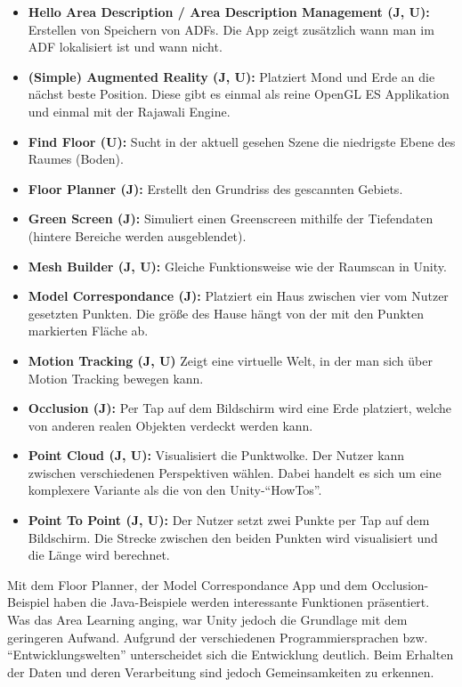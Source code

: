 \begin{itemize}
	\item\textbf{Hello Area Description / Area Description Management (J, U):} Erstellen von Speichern von ADFs. Die App zeigt zusätzlich wann man im ADF lokalisiert ist und wann nicht.
	\item\textbf{(Simple) Augmented Reality (J, U):} Platziert Mond und Erde an die nächst beste Position. Diese gibt es einmal als reine OpenGL ES Applikation und einmal mit der Rajawali Engine.
	\item\textbf{Find Floor (U):} Sucht in der aktuell gesehen Szene die niedrigste Ebene des Raumes (Boden).
	\item\textbf{Floor Planner (J):} Erstellt den Grundriss des gescannten Gebiets.
	\item\textbf{Green Screen (J):} Simuliert einen Greenscreen mithilfe der Tiefendaten (hintere Bereiche werden ausgeblendet).
	\item\textbf{Mesh Builder (J, U):} Gleiche Funktionsweise wie der Raumscan in Unity.
	\item\textbf{Model Correspondance (J):} Platziert ein Haus zwischen vier vom Nutzer gesetzten Punkten. Die größe des Hause hängt von der mit den Punkten markierten Fläche ab.
	\item\textbf{Motion Tracking (J, U)} Zeigt eine virtuelle Welt, in der man sich über Motion Tracking bewegen kann.
	\item\textbf{Occlusion (J):} Per Tap auf dem Bildschirm wird eine Erde platziert, welche von anderen realen Objekten verdeckt werden kann.
	\item\textbf{Point Cloud (J, U):} Visualisiert die Punktwolke. Der Nutzer kann zwischen verschiedenen Perspektiven wählen. Dabei handelt es sich um eine komplexere Variante als die von den Unity-"`HowTos"'.
	\item\textbf{Point To Point (J, U):} Der Nutzer setzt zwei Punkte per Tap auf dem Bildschirm. Die Strecke zwischen den beiden Punkten wird visualisiert und die Länge wird berechnet.
\end{itemize}
Mit dem Floor Planner, der Model Correspondance App und dem Occlusion-Beispiel haben die Java-Beispiele werden interessante Funktionen präsentiert. Was das Area Learning anging, war Unity jedoch die Grundlage mit dem geringeren Aufwand. Aufgrund der verschiedenen Programmiersprachen bzw. "`Entwicklungswelten"' unterscheidet sich die Entwicklung deutlich. Beim Erhalten der Daten und deren Verarbeitung sind jedoch Gemeinsamkeiten zu erkennen.